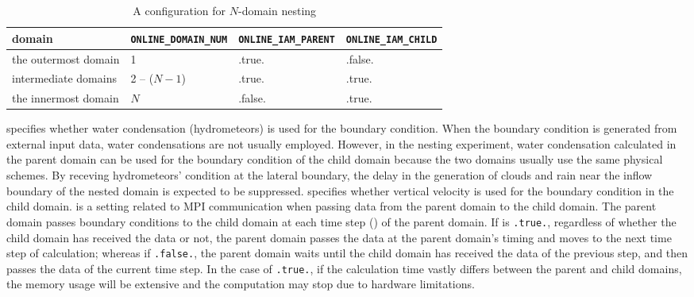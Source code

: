 \begin{table}[htb]
\begin{center}
\caption{A configuration for $N$-domain nesting}
\begin{tabularx}{150mm}{|l|l|l|X|} \hline
 \rowcolor[gray]{0.9} domain & \verb|ONLINE_DOMAIN_NUM| & \verb|ONLINE_IAM_PARENT| & \verb|ONLINE_IAM_CHILD|\\ \hline
 the outermost domain & 1            & .true.  & .false. \\ \hline
 intermediate domains & 2 -- ($N-1$) & .true.  & .true. \\ \hline
 the innermost domain & $N$          & .false. & .true. \\ \hline
\end{tabularx}
\label{tab:triple_nested}
\end{center}
\end{table}


 specifies whether water condensation (hydrometeors) is used for the boundary condition.
When the boundary condition is generated from external input data, water condensations are not usually employed.
However, in the \scalerm nesting experiment, water condensation calculated in the parent domain can be used for the boundary condition of the child domain because the two domains usually use the same physical schemes.
By receving hydrometeors' condition at the lateral boundary,
the delay in the generation of clouds and rain near the inflow boundary of the nested domain is expected to be suppressed.
 specifies whether vertical velocity is used for the boundary condition in the child domain.
%
 is a setting related to MPI communication when passing data from the parent domain to the child domain.
The parent domain passes boundary conditions to the child domain at each time step () of the parent domain.
If  is \verb|.true.|, regardless of whether the child domain has received the data or not,
the parent domain passes the data at the parent domain's timing and moves to the next time step of calculation;
whereas if \verb|.false.|, the parent domain waits until the child domain has received the data of the previous step,
and then passes the data of the current time step.
In the case of \verb|.true.|, if the calculation time vastly differs between the parent and child domains,
the memory usage will be extensive and the computation may stop due to hardware limitations.

